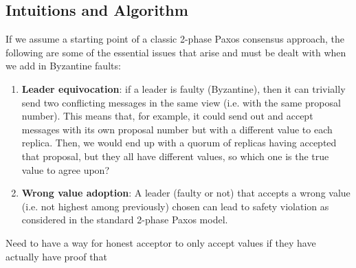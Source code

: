 \documentclass[10pt,a4paper]{article}
\begin{document}
\subsection{Intuitions and Algorithm}

If we assume a starting point of a classic 2-phase Paxos consensus approach, the following are some of the essential issues that arise and must be dealt with when we add in Byzantine faults:
\begin{enumerate}
    \item \textbf{Leader equivocation}: if a leader is faulty (Byzantine), then it can trivially send two conflicting messages in the same view (i.e. with the same proposal number). This means that, for example, it could send out and accept messages with its own proposal number but with a different value to each replica. Then, we would end up with a quorum of replicas having accepted that proposal, but they all have different values, so which one is the true value to agree upon?
    \item \textbf{Wrong value adoption}: A leader (faulty or not) that accepts a wrong value  (i.e. not highest among previously) chosen can lead to safety violation as considered in the standard 2-phase Paxos model.
\end{enumerate}

Need to have a way for honest acceptor to only accept values if they have actually have proof that 


\end{document}
